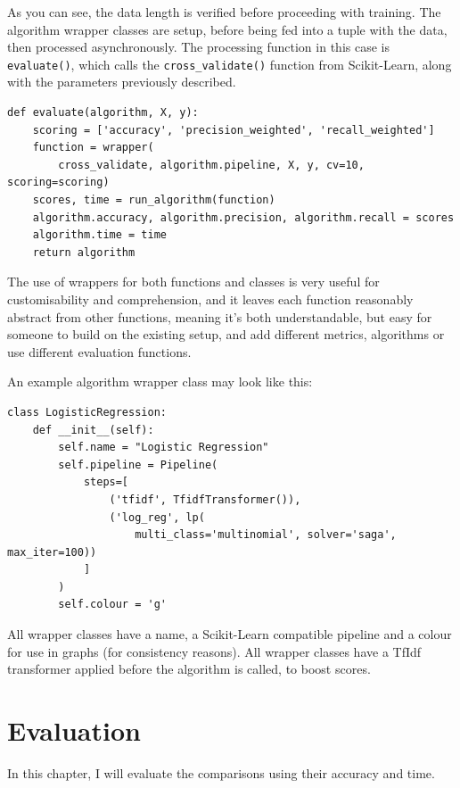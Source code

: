 \documentclass{article}
\begin{document}
As you can see, the data length is verified before proceeding with training.
The algorithm wrapper classes are setup, before being fed into a tuple with the data, then processed asynchronously.
The processing function in this case is \lstinline{evaluate()}, which calls the \lstinline{cross_validate()} function from Scikit-Learn, along with the parameters previously described.

\begin{lstlisting}[caption={Function for getting scores for a single algorithm},captionpos=b]
def evaluate(algorithm, X, y):
    scoring = ['accuracy', 'precision_weighted', 'recall_weighted']
    function = wrapper(
        cross_validate, algorithm.pipeline, X, y, cv=10, scoring=scoring)
    scores, time = run_algorithm(function)
    algorithm.accuracy, algorithm.precision, algorithm.recall = scores
    algorithm.time = time
    return algorithm
\end{lstlisting}

The use of wrappers for both functions and classes is very useful for customisability and comprehension, and it leaves each function reasonably abstract from other functions, meaning it's both understandable, but easy for someone to build on the existing setup, and add different metrics, algorithms or use different evaluation functions.

An example algorithm wrapper class may look like this:

\begin{lstlisting}[caption={Example classification algorithm wrapper class},captionpos=b]
	class LogisticRegression:
    def __init__(self):
        self.name = "Logistic Regression"
        self.pipeline = Pipeline(
            steps=[
                ('tfidf', TfidfTransformer()),
                ('log_reg', lp(
                    multi_class='multinomial', solver='saga', max_iter=100))
            ]
        )
        self.colour = 'g'
\end{lstlisting}

All wrapper classes have a name, a Scikit-Learn compatible pipeline and a colour for use in graphs (for consistency reasons).
All wrapper classes have a TfIdf transformer applied before the algorithm is called, to boost scores.

\newpage
\section{Evaluation}

In this chapter, I will evaluate the comparisons using their accuracy and time.
\end{document}
